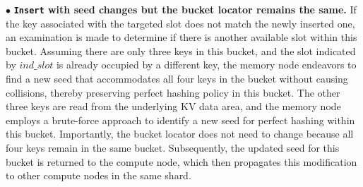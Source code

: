 $\bullet$ \textbf{\texttt{Insert} with seed changes but the bucket locator remains the same.}
If the key associated with the targeted slot does not match the newly inserted one, an examination is made to determine if there is another available slot within this bucket. Assuming there are only three keys in this bucket, and the slot indicated by $ind\_slot$ is already occupied by a different key, the memory node endeavors to find a new seed that accommodates all four keys in the bucket without causing collisions, thereby preserving perfect hashing policy in this bucket.
The other three keys are read from the underlying KV data area, and the memory node employs a brute-force approach to identify a new seed for perfect hashing within this bucket. Importantly, the bucket locator does not need to change because all four keys remain in the same bucket. Subsequently, the updated seed for this bucket is returned to the compute node, which then propagates this modification to other compute nodes in the same shard. 

\iffalse
\begin{algorithm}[t]
    \label{algorithm:insert}
    \caption{Data Insert Operation in Memory node}
    \LinesNumbered
    \SetAlgoNlRelativeSize{-1}
    \SetNlSty{textbf}{}{:}
    \textbf{DMPH\_Table} buckets []\\\textbf{Seed\_Array} seeds []\\
    \textbf{Hash\_Func} slot\_locator, hash\_fp\\
    
    \SetKwFunction{FMain}{Insert\_Callback\_Func}
    \SetKwProg{Fn}{Function}{:}{}
    \Fn{\FMain{key, val, ind\_bkt}}{
    lock (ind\_bkt)\;
    ind\_slot = slot\_locator (key, seeds[ind\_bkt])\;
    slot\_value = bucket [ind\_bkt][ind\_slot]\;
    \uIf{slot\_value.fingerprint == hash\_fp (key)}{
        \uIf{key == read\_key\_from\_kv\_blocks ()}{
        \tcp{The mapped slot holds the same key }
        resolve\_to\_data\_update()\;
        unlock(ind\_bkt); return\;
    }\textbf{end}\\}
    \textbf{end}\\
    write kv block into data area\;
    keys [] = read four keys from kv blocks with ind\_bkt\;
    \uIf{slot\_value.length == 0}{
        \tcp{ Insert kv pair without seed change}
        compose kv slot into DMPH table\;
    }
    \uElseIf{there is an available slot for inserted key}{
    seeds [ind\_bkt] = search new seed for the bucket\;
    adjust keys order in the DMPH table\;   
    }
    \uElse{
    \tcp{The bucket is full with other keys}
    insert kv index into the overflow cache\;
    }
    \textbf{end}\\
    unlock (ind\_bkt)\;
    }
    \textbf{End}\\
\end{algorithm}
\fi


